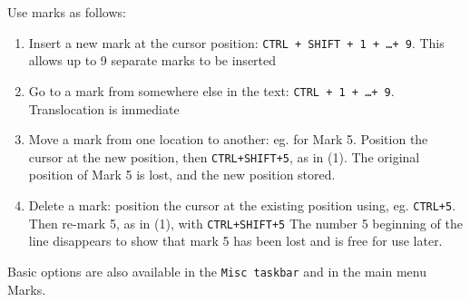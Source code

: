 Use marks as follows:
\begin{enumerate}
  \item Insert a new mark at the cursor position: \texttt{CTRL + SHIFT + 1 + \ldots + 9}.
    This allows up to 9 separate marks to be inserted
  \item Go to a mark from somewhere else in the text: \texttt{CTRL + 1 + \ldots + 9}.
    Translocation is immediate
  \item Move a mark from one location to another: eg. for Mark 5.
    Position the cursor at the new position, then \texttt{CTRL+SHIFT+5}, as in (1).
    The original position of Mark 5 is lost, and the new position stored.
  \item Delete a mark: position the cursor at the existing position using, eg. \texttt{CTRL+5}.
    Then re-mark 5, as in (1), with \texttt{CTRL+SHIFT+5}
    The number 5 beginning of the line disappears to show that mark 5 has been lost and is free for use later.
\end{enumerate}

Basic options are also available in the \texttt{Misc taskbar} and in the main menu Marks.